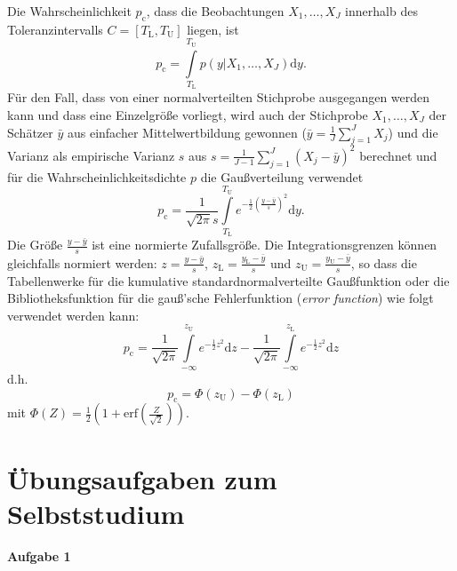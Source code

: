 Die Wahrscheinlichkeit $p_\mathrm{c}$, dass die Beobachtungen ${X_1,\dots,X_J}$ innerhalb des Toleranzintervalls
$C = [T_\mathrm{L}, T_\mathrm{U}]$ liegen, ist
\begin{equation}
	p_\mathrm{c} =  \int\limits_{T_\mathrm{L}}^{T_\mathrm{U}} p(y|{X_1,\dots,X_J}) \mathrm{d}y.
\end{equation}
Für den Fall, dass von einer normalverteilten Stichprobe ausgegangen werden kann und dass eine Einzelgröße
vorliegt, wird auch der Stichprobe ${X_1,\dots,X_J}$ der Schätzer $\bar y$ aus einfacher Mittelwertbildung
gewonnen ($\bar y = \frac{1}{J} \sum\limits_{j=1}^J X_j$) und die Varianz als empirische Varianz $s$ aus
$s = \frac{1}{J-1}\sum\limits_{j=1}^J (X_j - \bar y)^2$ berechnet
und für die Wahrscheinlichkeitsdichte $p$ die Gaußverteilung verwendet
\begin{equation}
	p_\mathrm{c} = \frac{1}{\sqrt{2 \pi} s} \int\limits_{T_\mathrm{L}}^{T_\mathrm{U}}
	e^{-\frac{1}{2}\left(\frac{y - \bar y}{s}\right)^2} \mathrm{d}y .
\end{equation}
Die Größe $\frac{y - \bar y}{s}$ ist eine normierte Zufallsgröße. Die Integrationsgrenzen können gleichfalls
normiert werden: $z = \frac{y - \bar y}{s}$, $z_\mathrm{L} = \frac{y_\mathrm{L} - \bar y}{s}$ und
$z_\mathrm{U} = \frac{y_\mathrm{U} - \bar y}{s}$, so dass die Tabellenwerke für die kumulative
standardnormalverteilte Gaußfunktion oder die Bibliotheksfunktion
für die gauß'sche Fehlerfunktion (\textsl{error function}) wie folgt verwendet werden kann:
\begin{equation}
p_\mathrm{c} = \frac{1}{\sqrt{2 \pi}} \int\limits_{-\infty}^{z_\mathrm{U}}
	e^{-\frac{1}{2} z^2} \mathrm{d}z -
	\frac{1}{\sqrt{2 \pi}} \int\limits_{-\infty}^{z_\mathrm{L}} e^{-\frac{1}{2} z^2} \mathrm{d}z
\end{equation}
d.h.
\begin{equation}
	p_\mathrm{c} = \Phi(z_\mathrm{U}) - \Phi(z_\mathrm{L})
\end{equation}
mit $\Phi(Z) = \frac{1}{2} \left(1 + \mathrm{erf}\left(\frac{Z}{\sqrt{2}}\right) \right)$.

%
%


\section{Übungsaufgaben zum Selbststudium}
\label{AufgVorl5}

\textbf{Aufgabe 1}\\

